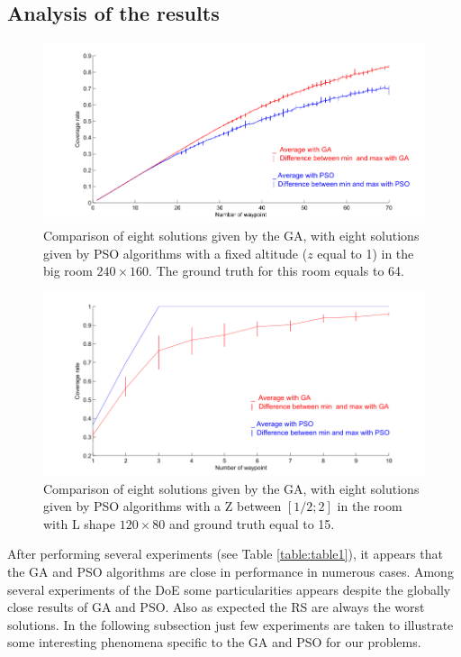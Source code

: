 \subsection{Analysis of the results }

\begin{figure}[!]
  \includegraphics[width=\linewidth]{img/fig8.png}
  \caption{Comparison of eight solutions given by the GA, with eight solutions given by PSO algorithms with a fixed altitude ($z$ equal to 1) in the big room $240\times160$. The ground truth for this room equals to 64.}
  \label{fig:bigRz1}
   \endminipage\hfill
\end{figure}
%
%
\begin{figure}[!]
  \includegraphics[width=\linewidth]{img/fig9.png}
  \caption{Comparison of eight solutions given by the GA, with eight solutions given by PSO algorithms with a Z between $[1/2; 2]$ in the room with L shape $120\times80$ and ground truth equal to 15.}\label{fig:RLz2}
   \endminipage\hfill
\end{figure}
After performing several experiments (see Table \ref{table:table1}), it appears that the GA and PSO algorithms are close in performance in numerous cases. Among several experiments of the DoE some particularities appears despite the globally close results of GA and PSO. Also as expected the RS are always the worst solutions.
 In the following subsection just few experiments are taken to illustrate some interesting phenomena specific to the GA and PSO for our problems.

